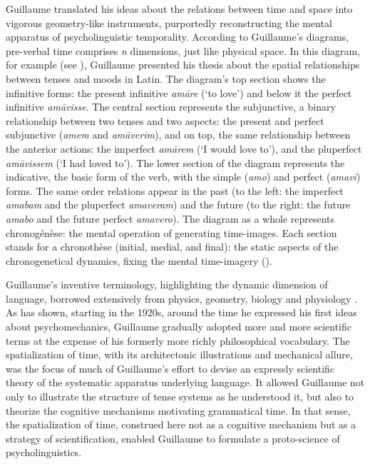 \documentclass[output=paper]{langsci/langscibook}
\begin{document}
Guillaume translated his ideas about the relations between time and space into vigorous geometry-like instruments, purportedly reconstructing the mental apparatus of psycholinguistic temporality. According to Guillaume’s diagrams, pre-verbal time comprises \textit{n} dimensions, just like physical space. In this diagram, for example (see ), Guillaume presented his thesis about the spatial relationships between tenses and moods in Latin. The diagram’s top section shows the infinitive forms: the present infinitive \textit{amāre} (`to love') and below it the perfect infinitive \textit{am{āvisse}}. The central section represents the subjunctive, a binary relationship between two tenses and two aspects: the present and perfect subjunctive (\textit{amem} and \textit{amāverim}), and on top, the same relationship between the anterior actions: the imperfect \textit{amārem} (`I would love to'), and the pluperfect \textit{amāvissem} (`I had loved to'). The lower section of the diagram represents the indicative, the basic form of the verb, with the simple (\textit{amo}) and perfect (\textit{amavi}) forms. The same order relations appear in the past (to the left: the imperfect \textit{amabam} and the pluperfect \textit{amaveram}) and the future (to the right: the future \textit{amabo} and the future perfect \textit{amavero}). The diagram as a whole represents chronogénèse: the mental operation of generating time-images. Each section stands for a chronothèse (initial, medial, and final): the static aspects of the chronogenetical dynamics, fixing the mental time-imagery (\citealt{boone_dictionnaire_1996}).

Guillaume’s inventive terminology, highlighting the dynamic dimension of language, borrowed extensively from physics, geometry, biology and physiology \citep{bottineau_terminologie_2006}. As \citet{valette_conceptualisation_2003} has shown, starting in the 1920s, around the time he expressed his first ideas about psychomechanics, Guillaume gradually adopted more and more scientific terms at the expense of his formerly more richly philosophical vocabulary. The spatialization of time, with its architectonic illustrations and mechanical allure, was the focus of much of Guillaume’s effort to devise an expressly scientific theory of the systematic apparatus underlying language. It allowed Guillaume not only to illustrate the structure of tense systems as he understood it, but also to theorize the cognitive mechanisms motivating grammatical time. In that sense, the spatialization of time, construed here not as a cognitive mechanism but as a strategy of scientification, enabled Guillaume to formulate a proto-science of psycholinguistics.
\end{document}

